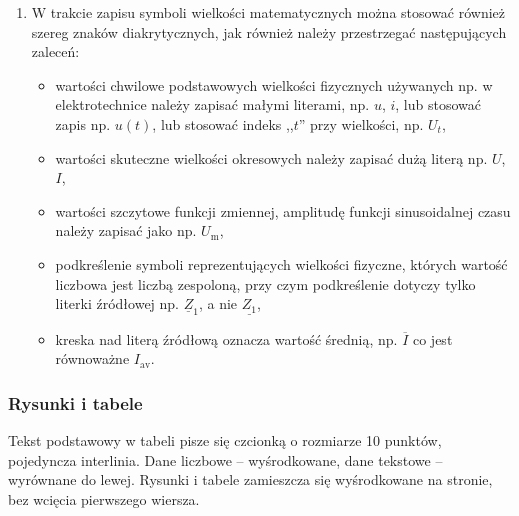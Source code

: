 \documentclass[12pt,twoside]{article}
\begin{document}
\begin{enumerate}[label=\arabic*), leftmargin=1.25cm]
\begin{itemize}[label=-,labelsep=0.4cm,leftmargin=0.6cm]
	      \end{itemize}

	\item W trakcie zapisu symboli wielkości matematycznych można stosować również szereg znaków diakrytycznych, jak również należy przestrzegać następujących zaleceń:

	      \begin{itemize}[label=-,labelsep=0.4cm,leftmargin=0.6cm]
		      \item wartości chwilowe podstawowych wielkości fizycznych używanych np. w elektrotechnice należy zapisać małymi literami, np. $u$, $i$, lub stosować zapis np. $u(t)$, lub stosować indeks ,,$t$'' przy wielkości, np. $U_t$,

		      \item wartości skuteczne wielkości okresowych należy zapisać dużą literą np. $U$, $I$,

		      \item wartości szczytowe funkcji zmiennej, amplitudę funkcji sinusoidalnej czasu należy zapisać jako np. $U_\mathrm{m}$,

		      \item podkreślenie symboli reprezentujących wielkości fizyczne, których wartość liczbowa jest liczbą zespoloną, przy czym podkreślenie dotyczy tylko literki źródłowej np. $\underline{Z}_1$, a nie $\underline{Z_1}$,

		      \item kreska nad literą źródłową oznacza wartość średnią, np. $\overline{I}$ co jest równoważne $I_\mathrm{av}$.

	      \end{itemize}

\end{enumerate}




\subsubsection{Rysunki i tabele} \label{Subsec:Rysunki-i-tabele}
Tekst podstawowy w tabeli pisze się czcionką o rozmiarze 10 punktów, pojedyncza interlinia. Dane liczbowe – wyśrodkowane, dane tekstowe – wyrównane do lewej. Rysunki i tabele zamieszcza się wyśrodkowane na stronie, bez wcięcia pierwszego wiersza.
\end{document}
